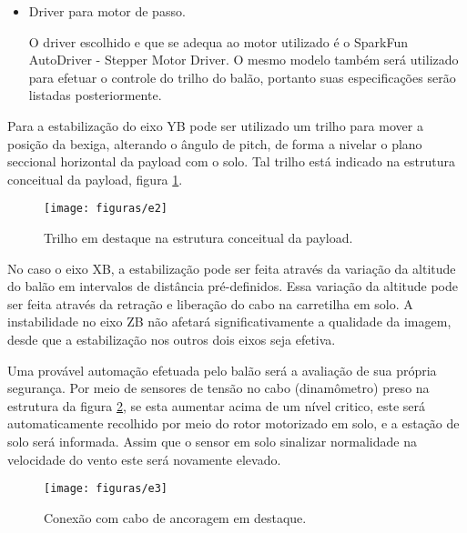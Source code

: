\begin{itemize}
			Seu eixo estaria acoplado ao disco maciço de alumínio.

			O motor especificado, modelo AK23/21F8FN1, consome 2.8A, necessita de uma tensão de 3.36Vdc e torque de 21 kgf.cm.

			Preço: R\$309,00.

		\item Driver para motor de passo.

			O  driver escolhido e que se adequa ao motor utilizado é o SparkFun AutoDriver - Stepper Motor Driver. O mesmo modelo também será utilizado para efetuar o controle do trilho do balão, portanto suas especificações serão listadas posteriormente.
	\end{itemize}

Para a estabilização do eixo YB pode ser utilizado um trilho para mover a posição da bexiga, alterando o ângulo de pitch, de forma a nivelar o plano seccional horizontal da payload com o solo. Tal trilho está indicado na estrutura conceitual da payload, figura \ref{img:trilhoestrutura}.

\begin{figure}[H]
  \centering
  \caption{Trilho em destaque na estrutura conceitual da payload.}
  \label{img:trilhoestrutura}
  \texttt{[image: figuras/e2]}
\end{figure}

No caso o eixo XB, a estabilização pode ser feita através da variação da altitude do balão em intervalos de distância pré-definidos. Essa variação da altitude pode ser feita através da retração e liberação do cabo na carretilha em solo. A instabilidade no eixo ZB não afetará significativamente a qualidade da imagem, desde que a estabilização nos outros dois eixos seja efetiva.

Uma provável automação efetuada pelo balão será a avaliação de sua própria segurança. Por meio de sensores de tensão no cabo (dinamômetro) preso na estrutura da figura \ref{img:caboancoragem}, se esta aumentar acima de um nível critico, este será automaticamente recolhido por meio do rotor motorizado em solo, e a estação de solo será informada. Assim que o sensor em solo sinalizar normalidade na velocidade do vento este será novamente elevado.

\begin{figure}[H]
  \centering
  \caption{Conexão com cabo de ancoragem em destaque.}
  \label{img:caboancoragem}
  \texttt{[image: figuras/e3]}
\end{figure}


